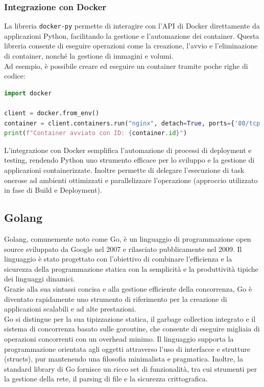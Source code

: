 \subsubsection{Integrazione con Docker}

La libreria \texttt{docker-py} permette di interagire con l'API di Docker direttamente da applicazioni Python, facilitando la gestione e l'automazione dei container. Questa libreria consente di eseguire operazioni come la creazione, l'avvio e l'eliminazione di container, nonché la gestione di immagini e volumi.\\
Ad esempio, è possibile creare ed eseguire un container tramite poche righe di codice:

\begin{lstlisting}[language=python]
import docker

client = docker.from_env()
container = client.containers.run("nginx", detach=True, ports={'80/tcp': 8080})
print(f"Container avviato con ID: {container.id}")
\end{lstlisting}

L'integrazione con Docker semplifica l'automazione di processi di deployment e testing, rendendo Python uno strumento efficace per lo sviluppo e la gestione di applicazioni containerizzate. Inoltre permette di delegare l'esecuzione di task onerose ad ambienti ottimizzati e parallelizzare l'operazione (approccio utilizzato in fase di Build e Deployment).

\subsection{Golang}

Golang, comunemente noto come Go, è un linguaggio di programmazione open source sviluppato da Google nel 2007 e rilasciato pubblicamente nel 2009. Il linguaggio è stato progettato con l'obiettivo di combinare l'efficienza e la sicurezza della programmazione statica con la semplicità e la produttività tipiche dei linguaggi dinamici.\\
Grazie alla sua sintassi concisa e alla gestione efficiente della concorrenza, Go è diventato rapidamente uno strumento di riferimento per la creazione di applicazioni scalabili e ad alte prestazioni.\\
Go si distingue per la sua tipizzazione statica, il garbage collection integrato e il sistema di concorrenza basato sulle goroutine, che consente di eseguire migliaia di operazioni concorrenti con un overhead minimo. Il linguaggio supporta la programmazione orientata agli oggetti attraverso l'uso di interfacce e strutture (structs), pur mantenendo una filosofia minimalista e pragmatica. Inoltre, la standard library di Go fornisce un ricco set di funzionalità, tra cui strumenti per la gestione della rete, il parsing di file e la sicurezza crittografica.\\

